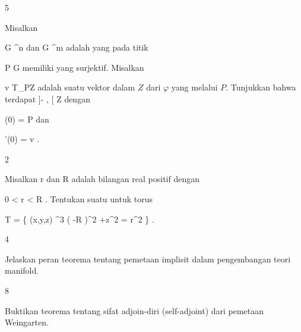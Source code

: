 {5}
{

Misalkan

\mavergleichskette
{\vergleichskette
{ G
}
{ \subseteq }{ \R^n
}
{  }{
}
{    }{
}
{   }{
}
}
{}{}{}
dan
\maabbdisp {\varphi} { G } { \R^m
} {}
adalah
yang pada titik

\mavergleichskette
{\vergleichskette
{ P
}
{ \in }{ G
}
{  }{
}
{    }{
}
{   }{
}
}
{}{}{}
memiliki
yang surjektif. Misalkan

\mavergleichskette
{\vergleichskette
{ v
}
{ \in }{ T_PZ
}
{  }{
}
{    }{
}
{   }{
}
}
{}{}{}
adalah suatu vektor dalam
$Z$ dari $\varphi$ yang melalui $P$. Tunjukkan bahwa terdapat
\maabbdisp {\gamma} { ]- \epsilon, \epsilon[ } { Z
} {}
 {} {}
dengan

\mavergleichskette
{\vergleichskette
{ \gamma(0)
}
{ = }{ P
}
{  }{
}
{    }{
}
{   }{
}
}
{}{}{}
dan

\mavergleichskettedisp
{\vergleichskette
{ \gamma'(0)
}
{ =} { v
}
{ } {
}
{ } {
}
{ } {
}
}
{}{}{}.

}
{} {}

{2}
{

Misalkan
\mathkor {} {r} {dan} {R} {}
adalah bilangan real positif dengan

\mavergleichskette
{\vergleichskette
{ 0
}
{ < }{ r
}
{ < }{ R
}
{    }{
}
{   }{
}
}
{}{}{.}
Tentukan suatu
untuk torus
 {} {}

\mavergleichskettedisp
{\vergleichskette
{ T
}
{ =} { \left\{ (x,y,z) \in \R^3  \mid   \left(   -R  \right)^2 +z^2  = r^2         \right\}
}
{ } {
}
{ } {
}
{ } {
}
}
{}{}{.}

}
{} {}

{4}
{

Jelaskan peran teorema tentang pemetaan implisit dalam pengembangan teori manifold.

}
{} {}

{8}
{

Buktikan teorema tentang sifat adjoin-diri (self-adjoint) dari pemetaan Weingarten.

}
{} {}

